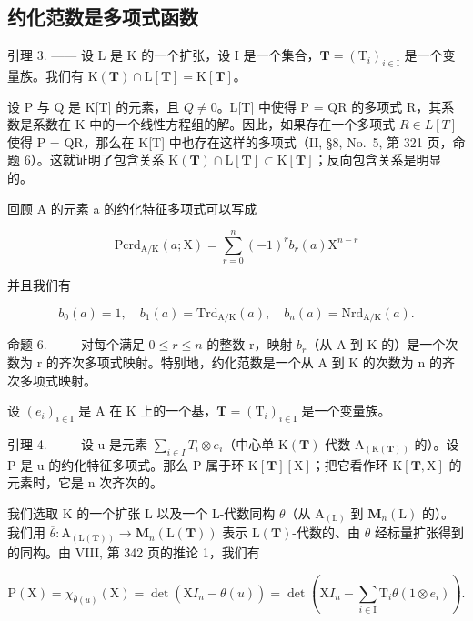 \subsection{约化范数是多项式函数}

引理 3. —— 设 L 是 K 的一个扩张，设 I 是一个集合，\(\mathbf{T} = (\mathrm{T}_i)_{i\in \mathrm{I}}\) 是一个变量族。我们有 \(\mathrm{K}(\mathbf{T})\cap \mathrm{L}[\mathbf{T}] = \mathrm{K}[\mathbf{T}]\)。

设 P 与 Q 是 K{[}T{]} 的元素，且 \(Q \neq 0\)。L{[}T{]} 中使得 P = QR 的多项式 R，其系数是系数在 K 中的一个线性方程组的解。因此，如果存在一个多项式 \(R \in L[T]\) 使得 P = QR，那么在 K{[}T{]} 中也存在这样的多项式（II, §8, No.~5, 第 321 页，命题 6）。这就证明了包含关系 \(\mathrm{K}(\mathbf{T}) \cap \mathrm{L}[\mathbf{T}] \subset \mathrm{K}[\mathbf{T}]\)；反向包含关系是明显的。

回顾 A 的元素 a 的约化特征多项式可以写成

\[
\mathrm{Pcrd} _ {\mathrm{A/K}} (a; \mathrm{X}) = \sum_ {r = 0} ^ {n} (- 1) ^ {r} b _ {r} (a) \mathrm{X} ^ {n - r}\tag{46}
\]

并且我们有

\[
b _ {0} (a) = 1, \quad b _ {1} (a) = \mathrm{Trd} _ {\mathrm{A/K}} (a), \quad b _ {n} (a) = \mathrm{Nrd} _ {\mathrm{A/K}} (a).
\]

命题 6. —— 对每个满足 \(0 \leqslant r \leqslant n\) 的整数 r，映射 \(b_{r}\)（从 A 到 K 的）是一个次数为 r 的齐次多项式映射。特别地，约化范数是一个从 A 到 K 的次数为 n 的齐次多项式映射。

设 \((e_{i})_{i\in\mathrm{I}}\) 是 A 在 K 上的一个基，\(\mathbf{T}=(\mathrm{T}_{i})_{i\in\mathrm{I}}\) 是一个变量族。

引理 4. —— 设 u 是元素 \(\sum_{i\in I}T_{i}\otimes e_{i}\)（中心单 \(\mathrm{K}(\mathbf{T})\)-代数 \(\mathrm{A}_{(\mathrm{K}(\mathbf{T}))}\) 的）。设 P 是 u 的约化特征多项式。那么 P 属于环 \(\mathrm{K}[\mathbf{T}][\mathrm{X}]\)；把它看作环 \(\mathrm{K}[\mathbf{T},\mathrm{X}]\) 的元素时，它是 n 次齐次的。

我们选取 K 的一个扩张 L 以及一个 L-代数同构 \(\theta\)（从 \(\mathrm{A}_{(\mathrm{L})}\) 到 \(\mathbf{M}_{n}(\mathrm{L})\) 的）。我们用 \(\overline{\theta}: \mathrm{A}_{(\mathrm{L}(\mathbf{T}))} \to \mathbf{M}_{n}(\mathrm{L}(\mathbf{T}))\) 表示 \(\mathrm{L}(\mathbf{T})\)-代数的、由 \(\theta\) 经标量扩张得到的同构。由 VIII, 第 342 页的推论 1，我们有

\[
\mathrm{P} (\mathrm{X}) = \chi_ {\overline {{\theta}} (u)} (\mathrm{X}) = \det (\mathrm{X} I _ {n} - \overline {{\theta}} (u)) = \det \left(\mathrm{X} I _ {n} - \sum_ {i \in \mathrm{I}} \mathrm{T} _ {i} \theta (1 \otimes e _ {i})\right).\tag{47}
\]

